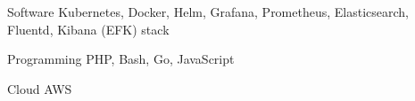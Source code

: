 


\begin{cvskills}


\cvskill
{Software} %
{Kubernetes, Docker, Helm, Grafana, Prometheus, Elasticsearch, Fluentd, Kibana (EFK) stack} %


\cvskill
{Programming} %
{PHP, Bash, Go, JavaScript} %


\cvskill
{Cloud} %
{AWS} %


\end{cvskills}

